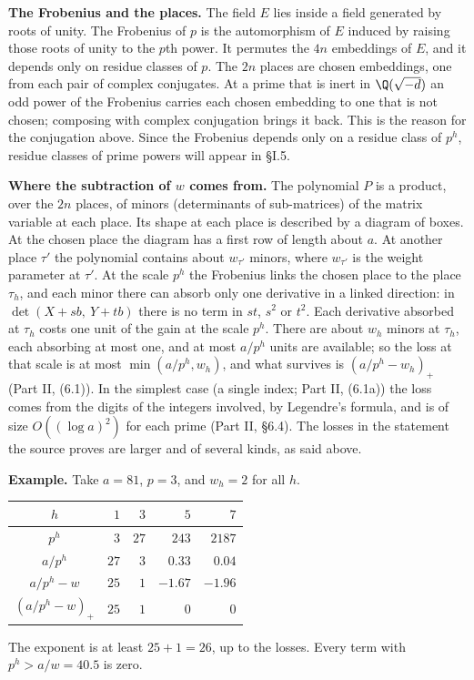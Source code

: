 \documentclass[11pt,letterpaper]{article}
\begin{document}
\textbf{The Frobenius and the places.} The field $E$ lies inside a field generated by roots of unity. The
Frobenius of $p$ is the automorphism of $E$ induced by raising those roots of unity to the $p$th power. It
permutes the $4n$ embeddings of $E$, and it depends only on residue classes of $p$. The $2n$ places are
chosen embeddings, one from each pair of complex conjugates. At a prime that is inert in $\Q(\sqrt{-d})$ an
odd power of the Frobenius carries each chosen embedding to one that is not chosen; composing with complex
conjugation brings it back. This is the reason for the conjugation above. Since the Frobenius
depends only on a residue class of $p^h$, residue classes of prime powers will appear in \S I.5.

\textbf{Where the subtraction of $w$ comes from.} The polynomial $P$ is a product, over the $2n$ places, of
minors (determinants of sub-matrices) of the matrix variable at each place. Its shape at each place is
described by a diagram of boxes. At the chosen place the diagram has a first row of length about $a$. At
another place $\tau'$ the polynomial contains about $w_{\tau'}$ minors, where $w_{\tau'}$ is the weight
parameter at $\tau'$. At the scale $p^h$ the Frobenius links the chosen place to the place $\tau_h$, and each
minor there can absorb only one derivative in a linked direction: in $\det(X+sb,\ Y+tb)$ there is no term in
$st$, $s^2$ or $t^2$. Each derivative absorbed at $\tau_h$ costs one unit of the gain at the scale $p^h$. There are
about $w_h$ minors at $\tau_h$, each absorbing at most one, and at most $a/p^h$ units are available; so the
loss at that scale is at most $\min(a/p^h,w_h)$, and what survives is $(a/p^h-w_h)_+$ (Part II, (6.1)).
In the simplest case (a single index; Part II, (6.1a)) the loss comes from the digits of the integers involved, by Legendre's
formula, and is of size $O((\log a)^2)$ for each prime (Part II, \S6.4). The losses in the statement the
source proves are larger and of several kinds, as said above.

\textbf{Example.} Take $a=81$, $p=3$, and $w_h=2$ for all $h$.
\begin{center}\small
\begin{tabular}{c|rrrr}
\toprule
$h$ & $1$ & $3$ & $5$ & $7$\\
\midrule
$p^h$ & $3$ & $27$ & $243$ & $2187$\\
$a/p^h$ & $27$ & $3$ & $0.33$ & $0.04$\\
$a/p^h-w$ & $25$ & $1$ & $-1.67$ & $-1.96$\\
$(a/p^h-w)_+$ & $25$ & $1$ & $0$ & $0$\\
\bottomrule
\end{tabular}
\end{center}
\noindent The exponent is at least $25+1=26$, up to the losses. Every term with $p^h>a/w=40.5$ is zero.
\end{document}

